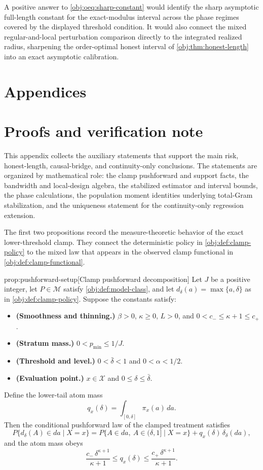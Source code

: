\documentclass[11pt]{article}
\begin{document}
A positive answer to \cref{obj:oeq:sharp-constant} would identify the sharp asymptotic full-length constant for the exact-modulus interval across the phase regimes covered by the displayed threshold condition. It would also connect the mixed regular-and-local perturbation comparison directly to the integrated realized radius, sharpening the order-optimal honest interval of \cref{obj:thm:honest-length} into an exact asymptotic calibration.


\appendix

\section*{Appendices}

\section{Proofs and verification note}
\label{sec:appendix-proofs-verification}

This appendix collects the auxiliary statements that support the main risk, honest-length, causal-bridge, and continuity-only conclusions. The statements are organized by mathematical role: the clamp pushforward and support facts, the bandwidth and local-design algebra, the stabilized estimator and interval bounds, the phase calculations, the population moment identities underlying total-Gram stabilization, and the uniqueness statement for the continuity-only regression extension.

The first two propositions record the measure-theoretic behavior of the exact lower-threshold clamp. They connect the deterministic policy in \cref{obj:def:clamp-policy} to the mixed law that appears in the observed clamp functional in \cref{obj:def:clamp-functional}.

\begin{propositionv}{prop:pushforward-setup}[Clamp pushforward decomposition]
Let \(J\) be a positive integer, let \(P\in\mathcal M\) satisfy \cref{obj:def:model-class}, and let \(d_\delta(a)=\max\{a,\delta\}\) as in \cref{obj:def:clamp-policy}. Suppose the constants satisfy:
\begin{itemize}
\item \textbf{(Smoothness and thinning.)} \(\beta>0\), \(\kappa\geq 0\), \(L>0\), and \(0<c_-\leq \kappa+1\leq c_+\).
\item \textbf{(Stratum mass.)} \(0<p_{\min}\leq 1/J\).
\item \textbf{(Threshold and level.)} \(0<\bar\delta<1\) and \(0<\alpha<1/2\).
\item \textbf{(Evaluation point.)} \(x\in\mathcal X\) and \(0\leq\delta\leq\bar\delta\).
\end{itemize}
Define the lower-tail atom mass
\[
q_x(\delta)=\int_{[0,\delta]}\pi_x(a)\,da .
\]
Then the conditional pushforward law of the clamped treatment satisfies
\[
P\{d_\delta(A)\in da\mid X=x\}
=
P\{A\in da,\ A\in(\delta,1]\mid X=x\}
+
q_x(\delta)\,\delta_\delta(da),
\]
and the atom mass obeys
\[
\frac{c_-\,\delta^{\kappa+1}}{\kappa+1}
\leq
q_x(\delta)
\leq
\frac{c_+\,\delta^{\kappa+1}}{\kappa+1}.
\]
\end{propositionv}
\end{document}
